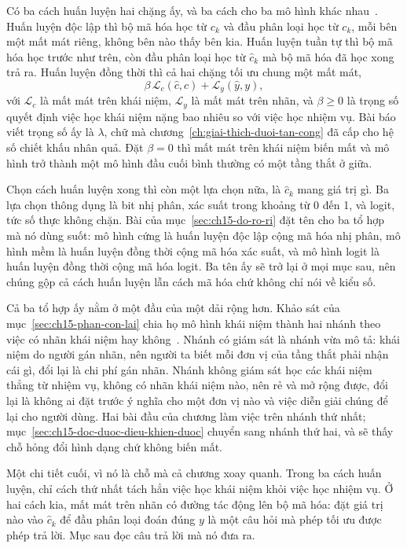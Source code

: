 %
Có ba cách huấn luyện hai chặng ấy, và ba cách cho ba mô hình khác
nhau~\autocite{p30leakage}. Huấn luyện độc lập thì bộ mã hóa học từ $c_k$ và đầu
phân loại học từ $c_k$, mỗi bên một mất mát riêng, không bên nào thấy bên kia.
Huấn luyện tuần tự thì bộ mã hóa học trước như trên, còn đầu phân loại học từ
$\hat c_k$ mà bộ mã hóa đã học xong trả ra. Huấn luyện đồng thời thì cả hai chặng
tối ưu chung một mất mát,
\[
  \beta \, \mathcal{L}_c(\hat c, c) + \mathcal{L}_y(\hat y, y) ,
\]
với $\mathcal{L}_c$ là mất mát trên khái niệm, $\mathcal{L}_y$ là mất mát trên
nhãn, và $\beta \ge 0$ là trọng số quyết định việc học khái niệm nặng bao nhiêu
so với việc học nhiệm vụ. Bài báo viết trọng số ấy là $\lambda$, chữ mà
chương~\ref{ch:giai-thich-duoi-tan-cong} đã cấp cho hệ số chiết khấu nhân quả.
Đặt $\beta = 0$ thì mất mát trên khái niệm biến mất và mô hình trở thành một mô
hình đầu cuối bình thường có một tầng thắt ở giữa.

%
Chọn cách huấn luyện xong thì còn một lựa chọn nữa, là $\hat c_k$ mang giá trị
gì. Ba lựa chọn thông dụng là bit nhị phân, xác suất trong khoảng từ 0 đến 1, và
logit, tức số thực không chặn. Bài của mục~\ref{sec:ch15-do-ro-ri} đặt tên cho ba
tổ hợp mà nó dùng suốt: mô hình cứng là huấn luyện độc lập cộng mã hóa nhị phân,
mô hình mềm là huấn luyện đồng thời cộng mã hóa xác suất, và mô hình logit là
huấn luyện đồng thời cộng mã hóa logit. Ba tên ấy sẽ trở lại ở mọi mục sau, nên
chúng gộp cả cách huấn luyện lẫn cách mã hóa chứ không chỉ nói
về kiểu số.

%
Cả ba tổ hợp ấy nằm ở một đầu của một dải rộng hơn. Khảo sát của
mục~\ref{sec:ch15-phan-con-lai} chia họ mô hình khái niệm thành hai nhánh theo
việc có nhãn khái niệm hay không~\autocite{p31cbmrisks}. Nhánh có giám sát là
nhánh vừa mô tả: khái niệm do người gán nhãn, nên người ta biết mỗi đơn vị của
tầng thắt phải nhận cái gì, đổi lại là chi phí gán nhãn. Nhánh không giám sát
học các khái niệm thẳng từ nhiệm vụ, không có nhãn khái niệm nào, nên rẻ và mở
rộng được, đổi lại là không ai đặt trước ý nghĩa cho một đơn vị nào và việc diễn
giải chúng để lại cho người dùng. Hai bài đầu của chương làm việc trên nhánh thứ
nhất; mục~\ref{sec:ch15-doc-duoc-dieu-khien-duoc} chuyển sang nhánh thứ hai, và
sẽ thấy chỗ hỏng đổi hình dạng chứ không biến mất.

%
Một chi tiết cuối, vì nó là chỗ mà cả chương xoay quanh. Trong ba cách huấn
luyện, chỉ cách thứ nhất tách hẳn việc học khái niệm khỏi việc học nhiệm vụ. Ở
hai cách kia, mất mát trên nhãn có đường tác động lên bộ mã hóa: đặt giá trị nào
vào $\hat c_k$ để đầu phân loại đoán đúng $y$ là một câu hỏi mà phép tối ưu được
phép trả lời. Mục sau đọc câu trả lời mà nó đưa ra.
